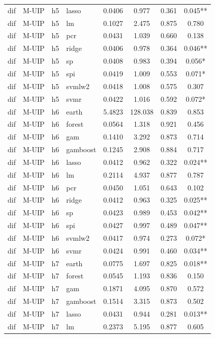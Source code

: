 \begin{ThreePartTable}
\begin{longtable}[t]{llclcccc}
dif & M-UIP & h5 & lasso & 0.0406 & 0.977 & 0.361 & 0.045**\\
dif & M-UIP & h5 & lm & 0.1027 & 2.475 & 0.875 & 0.780\\
dif & M-UIP & h5 & pcr & 0.0431 & 1.039 & 0.660 & 0.138\\
dif & M-UIP & h5 & ridge & 0.0406 & 0.978 & 0.364 & 0.046**\\
dif & M-UIP & h5 & sp & 0.0408 & 0.983 & 0.394 & 0.056*\\
dif & M-UIP & h5 & spi & 0.0419 & 1.009 & 0.553 & 0.071*\\
dif & M-UIP & h5 & svmlw2 & 0.0418 & 1.008 & 0.575 & 0.307\\
dif & M-UIP & h5 & svmr & 0.0422 & 1.016 & 0.592 & 0.072*\\
\addlinespace
dif & M-UIP & h6 & earth & 5.4823 & 128.038 & 0.839 & 0.853\\
dif & M-UIP & h6 & forest & 0.0564 & 1.318 & 0.921 & 0.456\\
dif & M-UIP & h6 & gam & 0.1410 & 3.292 & 0.873 & 0.714\\
dif & M-UIP & h6 & gamboost & 0.1245 & 2.908 & 0.884 & 0.717\\
dif & M-UIP & h6 & lasso & 0.0412 & 0.962 & 0.322 & 0.024**\\
dif & M-UIP & h6 & lm & 0.2114 & 4.937 & 0.877 & 0.787\\
dif & M-UIP & h6 & pcr & 0.0450 & 1.051 & 0.643 & 0.102\\
dif & M-UIP & h6 & ridge & 0.0412 & 0.963 & 0.325 & 0.025**\\
dif & M-UIP & h6 & sp & 0.0423 & 0.989 & 0.453 & 0.042**\\
dif & M-UIP & h6 & spi & 0.0427 & 0.997 & 0.489 & 0.047**\\
dif & M-UIP & h6 & svmlw2 & 0.0417 & 0.974 & 0.273 & 0.072*\\
dif & M-UIP & h6 & svmr & 0.0424 & 0.991 & 0.460 & 0.034**\\
\addlinespace
dif & M-UIP & h7 & earth & 0.0775 & 1.697 & 0.825 & 0.018**\\
dif & M-UIP & h7 & forest & 0.0545 & 1.193 & 0.836 & 0.150\\
dif & M-UIP & h7 & gam & 0.1871 & 4.095 & 0.870 & 0.572\\
dif & M-UIP & h7 & gamboost & 0.1514 & 3.315 & 0.873 & 0.502\\
dif & M-UIP & h7 & lasso & 0.0431 & 0.944 & 0.281 & 0.013**\\
dif & M-UIP & h7 & lm & 0.2373 & 5.195 & 0.877 & 0.605\\

\end{longtable}
\end{ThreePartTable}
